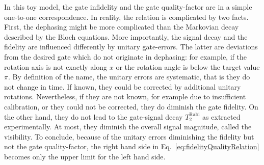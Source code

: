 \documentclass[aps, prx, showpacs, twocolumn, superscriptaddress, notitlepage, longbibliography, floatfix, nofootinbib]{revtex4-2}
\newcommand{\TRabi}{T_2^\mathrm{Rabi}}
\begin{document}
In this toy model, the gate infidelity and the gate quality-factor are in a simple one-to-one correspondence. In reality, the relation is complicated by two facts. First, the dephasing might be more complicated than the Markovian decay described by the Bloch equations. More importantly, the signal decay and the fidelity are influenced differently by unitary gate-errors. The latter are deviations from the desired gate which do not originate in dephasing: for example, if the rotation axis is not exactly along $x$ or the rotation angle is below the target value $\pi$. By definition of the name, the unitary errors are systematic, that is they do not change in time. If known, they could be corrected by additional unitary rotations. Nevertheless, if they are not known, for example due to insufficient calibration, or they could not be corrected, they do diminish the gate fidelity. On the other hand, they do not lead to the gate-signal decay $ \TRabi$ as extracted experimentally. At most, they diminish the overall signal magnitude, called the visibility.  To conclude, because of the unitary errors diminishing the fidelity but not the gate quality-factor, the right hand side in Eq.~\eqref{eq:fidelityQualityRelation} becomes only the upper limit for the left hand side. 
\end{document}
